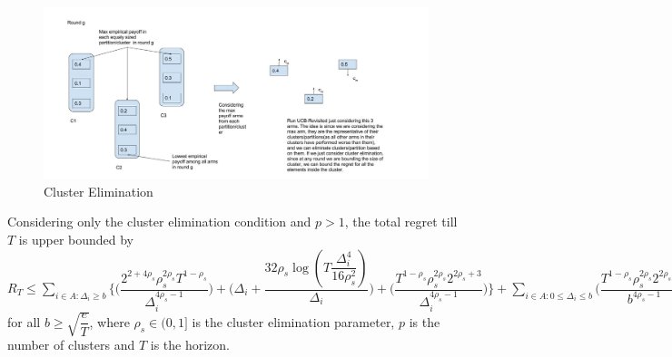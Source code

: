 \begin{figure}
\includegraphics[scale=0.3]{img/diagCluster.jpg}
\caption{Cluster Elimination}
\label{Fig:ClusFig}
\end{figure}

\begin{proposition}
Considering only the cluster elimination condition and $p>1$, the total regret till $T$ is upper bounded by $R_{T}\leq \sum_{i\in A:\Delta_{i}\geq b}\bigg\lbrace \bigg(\dfrac{2^{2+4\rho_{s}}\rho_{s}^{2\rho_{s}}T^{1-\rho_{s}}}{\Delta_{i}^{4\rho_{s}-1}}\bigg) + \bigg(\Delta_{i}+\dfrac{32\rho_{s}\log{(T\dfrac{\Delta_{i}^{4}}{16\rho_{s}^{2}})}}{\Delta_{i}}\bigg)  +  \bigg(\dfrac{T^{1-\rho_{s}}\rho_{s}^{2\rho_{s}}2^{2\rho_{s}+3}}{\Delta_{i}^{4\rho_{s} -1}} \bigg)\bigg \rbrace +\sum_{i\in A:0\leq\Delta_{i}\leq b}\bigg(\dfrac{T^{1-\rho_{s}}\rho_{s}^{2\rho_{s}}2^{2\rho_{s}+3}}{b^{4\rho_{s} -1}} \bigg) + max_{i:\Delta_{i}\leq b}\Delta_{i}T$ for all $b\geq \sqrt{\dfrac{e}{T}}$, where $\rho_{s}\in (0,1]$ is the cluster elimination parameter, $p$ is the number of clusters and $T$ is the horizon.
\end{proposition}


